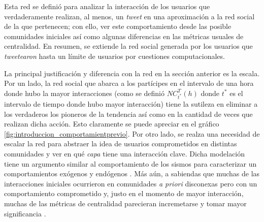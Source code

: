 \documentclass[../main.tex]{subfiles}
\begin{document}
Esta  red se definió para analizar la interacción de los usuarios que verdaderamente realizan, al menos, un \textit{tweet} en una aproximación a la red social de la que pertenecen; con ello, ver este comportamiento desde las posible comunidades iniciales así como algunas diferencias en las métricas usuales de centralidad. En resumen, se extiende la red social generada por los usuarios que \textit{tweetearon} hasta un límite de usuarios por cuestiones computacionales.

La principal justificación y diferencia con la red en la sección anterior es la escala. Por un lado, la red social que abarca a los partícipes en el intervalo de una hora donde hubo la mayor interacciones (como se definió $NC_{t^{*}}^{T}(h)$ donde $t^{*}$ es el intervalo de tiempo donde hubo mayor interacción) tiene la sutileza en eliminar a los verdaderos los pioneros de la tendencia así como en la cantidad de veces que realizan dicha acción.
Esto claramente se puede apreciar en el gráfico \ref{fig:introduccion_comportamientprevio}. %
Por otro lado, se realza una necesidad de escalar la red para abstraer la idea de usuarios comprometidos \cite{West2014} en distintas comunidades y ver en qué \textit{capa} tiene una interacción clave. Dicha modelación tiene un argumento similar al comportamiento de los sismos para caracterizar un comportamientos exógenos y endógenos \cite{Klimek2011_comportamientoend}. Más aún, a sabiendas que muchas de las interacciones iniciales ocurrieron en comunidades \textit{a priori} disconexas pero con un comportamiento comprometido \cite{D_weng2014predicting} y, justo en el momento de mayor interacción, muchas de las métricas de centralidad parecieran incremetarse y tomar mayor significancia \cite{Chng2015_bottom-up}.










\end{document}
